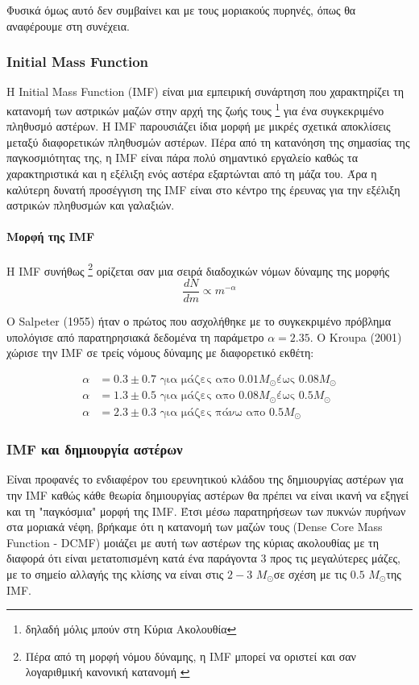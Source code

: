 \documentclass[a4paper,12pt]{memoir}
\newcommand{\sm}{$M_{\odot}$}
\begin{document}
Φυσικά όμως αυτό δεν συμβαίνει και με τους μοριακούς πυρηνές, όπως θα αναφέρουμε στη συνέχεια. 

\subsubsection{Initial Mass Function}
\label{par:imf}
Η Initial Mass Function (IMF) είναι μια εμπειρική συνάρτηση που χαρακτηρίζει τη κατανομή των αστρικών μαζών στην αρχή της ζωής τους \footnote{δηλαδή μόλις μπούν στη Κύρια Ακολουθία} για ένα συγκεκριμένο πληθυσμό αστέρων. Η IMF παρουσιάζει ίδια μορφή με μικρές σχετικά αποκλίσεις μεταξύ διαφορετικών πληθυσμών αστέρων. 
Πέρα από τη κατανόηση της σημασίας της παγκοσμιότητας της, η IMF είναι πάρα πολύ σημαντικό εργαλείο καθώς τα χαρακτηριστικά και η εξέλιξη ενός αστέρα εξαρτώνται από τη μάζα του. 
Άρα η καλύτερη δυνατή προσέγγιση της IMF είναι στο κέντρο της έρευνας για την εξέλιξη αστρικών πληθυσμών και γαλαξιών.

\paragraph{Μορφή της IMF}
Η IMF συνήθως \footnote{Πέρα από τη μορφή νόμου δύναμης, η IMF μπορεί να οριστεί και σαν λογαριθμική κανονική κατανομή \cite{salpeter_initial_2005}} ορίζεται σαν μια σειρά διαδοχικών νόμων δύναμης της μορφής 
\begin{equation}
\frac{dN}{dm} \propto m^{-\alpha}
\end{equation}

Ο Salpeter (1955) ήταν ο πρώτος που ασχολήθηκε με το συγκεκριμένο πρόβλημα υπολόγισε από παρατηρησιακά δεδομένα τη παράμετρο $\alpha=2.35$.
Ο Kroupa (2001) χώρισε την IMF σε τρείς νόμους δύναμης με διαφορετικό εκθέτη:

\begin{align}
\alpha&=0.3 \pm 0.7 \text{ για μάζες απο $0.01$\sm έως $0.08$\sm} \\
\alpha&=1.3 \pm 0.5 \text{ για μάζες απο $0.08$\sm έως $0.5$\sm} \\
\alpha&=2.3 \pm 0.3 \text{ για μάζες πάνω απο $0.5$\sm}
\end{align}

\subsubsection{IMF και δημιουργία αστέρων}
Είναι προφανές το ενδιαφέρον του ερευνητικού κλάδου της δημιουργίας αστέρων για την IMF καθώς κάθε θεωρία δημιουργίας αστέρων θα πρέπει να είναι ικανή να εξηγεί και τη "παγκόσμια" μορφή της IMF.
Έτσι μέσω παρατηρήσεων των πυκνών πυρήνων στα μοριακά νέφη, βρήκαμε ότι η κατανομή των μαζών τους (Dense Core Mass Function - DCMF) μοιάζει με αυτή των αστέρων της κύριας ακολουθίας με τη διαφορά ότι είναι μετατοπισμένη κατά ένα παράγοντα $3$ προς τις μεγαλύτερες μάζες, με το σημείο αλλαγής της κλίσης να είναι στις $2-3$ \sm σε σχέση με τις $0.5$ \sm της IMF. 
\end{document}
